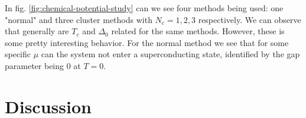 \documentclass[11pt]{article}
\begin{document}
In fig. \ref{fig:chemical-potential-study} can we see four methods being used: one "normal" and three cluster methods with $N_c = 1, 2, 3$ respectively. We can observe that generally are $T_c$ and $\Delta_0$ related for the same methods. However, these is some pretty interesting behavior. For the normal method we see that for some specific $\mu$ can the system not enter a superconducting state, identified by the gap parameter being 0 at $T=0$. 



\section{Discussion}\label{sec:discussion}


\onecolumn
\end{document}
